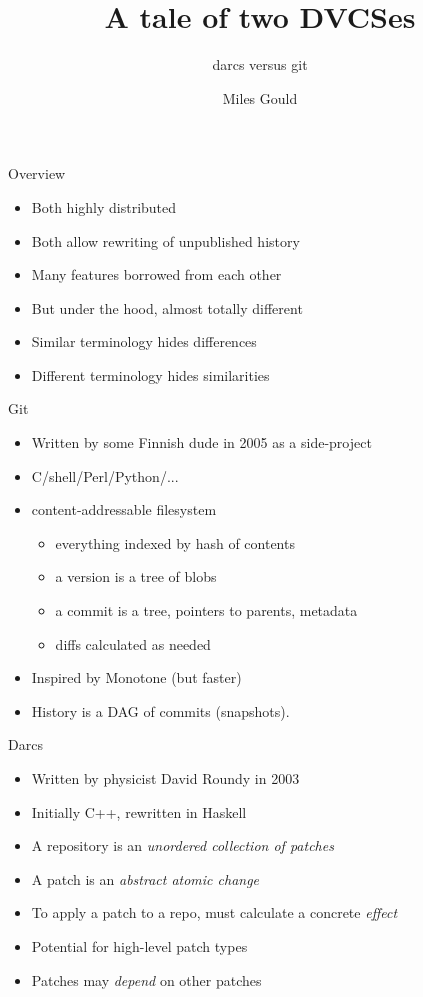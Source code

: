 \documentclass[pdf]{prosper}
\title{A tale of two DVCSes}
\subtitle{darcs versus git}
\author{Miles Gould}
\begin{document}
\maketitle


\begin{slide}{Overview}
\begin{itemize}
\item Both highly distributed
\item Both allow rewriting of unpublished history
\item Many features borrowed from each other
\item But under the hood, almost totally different
\item Similar terminology hides differences
\item Different terminology hides similarities
\end{itemize}
\end{slide}

\begin{slide}{Git}
\begin{itemize}
\item Written by some Finnish dude in 2005 as a side-project
\item C/shell/Perl/Python/...
\item content-addressable filesystem
\begin{itemize}
	\item everything indexed by hash of contents
	\item a version is a tree of blobs
	\item a commit is a tree, pointers to parents, metadata
	\item diffs calculated as needed
\end{itemize}
\item Inspired by Monotone (but faster)
\item History is a DAG of commits (snapshots).
\end{itemize}
\end{slide}

\begin{slide}{Darcs}
\begin{itemize}
\item Written by physicist David Roundy in 2003
\item Initially C++, rewritten in Haskell
\item A repository is an \emph{unordered collection of patches}
\item A patch is an \emph{abstract atomic change}
\item To apply a patch to a repo, must calculate a concrete \emph{effect}
\item Potential for high-level patch types
\item Patches may \emph{depend} on other patches
\end{itemize}
\end{slide}
\end{document}
